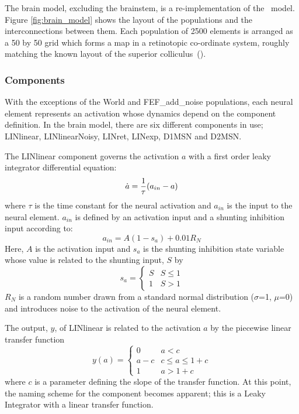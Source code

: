 \documentclass{frontiersSCNS}
\begin{document}
The brain model, excluding the brainstem, is a re-implementation of
the \ccg~model. Figure \ref{fig:brain_model} shows the layout of the
populations and the interconnections between them. Each population of
2500 elements is arranged as a 50 by 50 grid which forms a map in a
retinotopic co-ordinate system, roughly matching the known layout of
the superior colliculus~(). %

\subsubsection{Components}

With the exceptions of the World and
FEF\_add\_noise populations, each neural element represents an
activation whose dynamics depend on the component definition. In the
brain model, there are six different components in use; LINlinear,
LINlinearNoisy, LINret, LINexp, D1MSN and D2MSN.

The LINlinear component governs the activation $a$ with a first order
leaky integrator differential equation:
\[
   \dot{a} = {1 \over \tau}(a_{in}-a)
\]
where $\tau$ is the time constant for the neural activation and
$a_{in}$ is the input to the neural element. $a_{in}$ is defined by an
activation input and a shunting inhibition input according to:
\[
   a_{in} = A(1-s_a)+0.01 R_N
\]
Here, $A$ is the activation input and $s_a$ is the shunting inhibition
state variable whose value is related to the shunting input, $S$ by
\[
   s_a = \begin{cases}
      S & S\leq 1 \\
      1 & S > 1
   \end{cases}
\]
$R_N$ is a random number drawn from a
standard normal distribution ($\sigma$=1, $\mu$=0) and introduces noise
to the activation of the neural element.

The output, $y$, of LINlinear is related to the activation $a$ by the
piecewise linear transfer function
\[
   y(a) = \begin{cases}
      0   & a < c \\
      a-c & c \leq a \leq 1+c \\
      1   & a > 1+c
   \end{cases}
\]
where $c$ is a parameter defining the slope of the transfer
function. At this point, the naming scheme for the component becomes
apparent; this is a Leaky Integrator with a linear transfer function.
\end{document}
